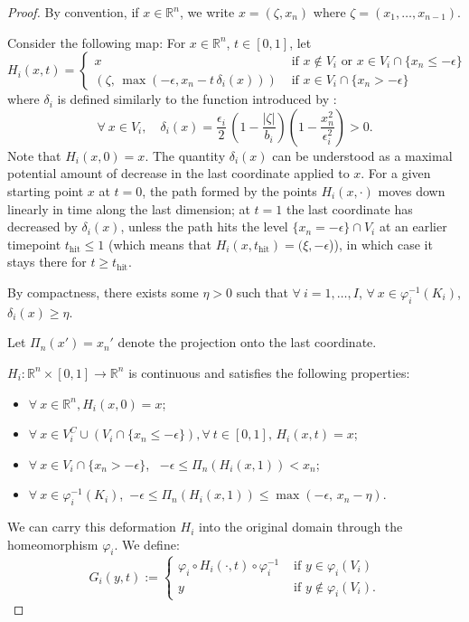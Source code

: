 \documentclass[11pt]{article}
\newcommand{\R}{\mathbb{R}}
\newcommand{\eps}{\epsilon}
\newcommand{\inter}{\cap}
\newcommand{\union}{\cup}
\theoremstyle{plain}
\theoremstyle{definition}
\theoremstyle{remark}
\begin{document}
\begin{proof}
		
		By convention, if $x \in \R^n$, we write $x = (\zeta, x_n)$ where $\zeta = (x_1,\ldots,x_{n-1})$.
		
		Consider the following map: For $x \in \R^n$, $t \in [0,1]$, let
		\[ H_i(x,t) =
		\begin{cases}
			x & \text{ if } x \notin V_i \text{ or } x \in V_i \inter \{x_n \leq - \eps\} \\
			(\zeta,\, \max(-\eps, x_n - t \, \delta_i(x) )) & \text{ if } x \in V_i \inter \{x_n > - \eps\}
		\end{cases}
		\]
		where $\delta_i$ is defined similarly to the function introduced by \cite{cantwell_topological_1968}:
		\[\forall\ x \in V_i, \quad \delta_i(x) = \frac{\eps_i}{2} \, \left(1 - \frac{|\zeta|}{b_i} \right) \left(1 - \frac{x_n^2}{\eps_i^2} \right) > 0 .\]
		Note that $H_i(x,0) = x$. The quantity $\delta_i(x)$ can be understood as a maximal potential amount of decrease in the last coordinate applied to $x$. 
		For a given starting point $x$ at $t = 0$, the path formed by the points $H_i(x, \cdot)$ moves down linearly in time along the last dimension; at $t = 1$ the last coordinate has decreased by $\delta_i(x)$, unless the path hits the level $\{x_n = -\eps\} \inter V_i$ at an earlier timepoint $t_{\mathrm{hit}} \leq 1$ (which means that $H_i(x,t_\mathrm{hit}) = (\xi, -\eps$)), in which case it stays there for $t \geq t_{\mathrm{hit}}$.
		
		By compactness, there exists some $\eta > 0$ such that $\forall\ i = 1, \ldots, I$, $\forall\ x \in \varphi_i^{-1}(K_i)$, $\delta_i(x) \geq \eta$.
		
		Let $\Pi_n(x') = x_n'$ denote the projection onto the last coordinate.
		
		$H_i : \R^n \times [0,1] \to \R^n$ is continuous and satisfies the following properties:
		
		\begin{itemize}
			\item $\forall\ x \in \R^n, H_i(x,0) = x$;
			\item $\forall\ x \in V_i^C \union (V_i \inter \{x_n \leq - \eps\}), \forall\ t \in [0,1],\, H_i(x,t) = x$;
			\item $\forall\ x \in V_i \inter \{x_n > - \eps\}$, \,
			$ -\eps \leq \Pi_n ( H_i(x,1) ) < x_n$;
			\item $\forall\ x \in \varphi_i^{-1}(K_i)$,\,
			$ -\eps \leq \Pi_n ( H_i(x,1) ) \leq \max(-\eps,\, x_n - \eta).$
		\end{itemize}
		
		We can carry this deformation $H_i$ into the original domain through the homeomorphism $\varphi_i$. We define:
		\[G_i(y,t) :=
		\begin{cases}
			\varphi_i \circ H_i(\cdot, t) \circ \varphi_i^{-1} &\text{ if } y \in \varphi_i(V_i) \\
			y &\text{ if } y \notin \varphi_i(V_i).
		\end{cases}
		\]
		

\end{proof}
\end{document}
